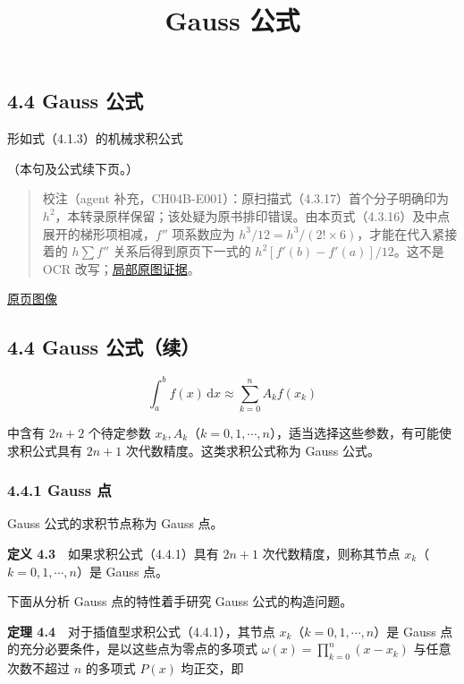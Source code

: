 \documentclass[
  10pt,
  fontset=fandol]{ctexart}
\title{Gauss 公式}
\author{}
\date{}
\begin{document}
\maketitle

\subsection{4.4 Gauss 公式}\label{gauss-ux516cux5f0f}

形如式（4.1.3）的机械求积公式

（本句及公式续下页。）

\begin{quote}
校注（agent 补充，CH04B-E001）：原扫描式（4.3.17）首个分子明确印为 \(h^2\)，本转录原样保留；该处疑为原书排印错误。由本页式（4.3.16）及中点展开的梯形项相减，\(f''\) 项系数应为 \(h^3/12=h^3/(2!\times6)\)，才能在代入紧接着的 \(h\sum f''\) 关系后得到原页下一式的 \(h^2[f'(b)-f'(a)]/12\)。这不是 OCR 改写；\href{../assets/ch04b/review-p106-middle.png}{局部原图证据}。
\end{quote}

\href{../../source-images/pdf-107.jpeg}{原页图像}

\subsection{4.4 Gauss 公式（续）}\label{gauss-ux516cux5f0fux7eed}

\[
\int_a^b f(x)\,\mathrm{d}x\approx\sum_{k=0}^{n}A_kf(x_k)
\tag{4.4.1}
\]

中含有 \(2n+2\) 个待定参数 \(x_k,A_k\)（\(k=0,1,\cdots,n\)），适当选择这些参数，有可能使求积公式具有 \(2n+1\) 次代数精度。这类求积公式称为 Gauss 公式。

\subsubsection{4.4.1 Gauss 点}\label{gauss-ux70b9}

Gauss 公式的求积节点称为 Gauss 点。

\textbf{定义 4.3}　如果求积公式（4.4.1）具有 \(2n+1\) 次代数精度，则称其节点 \(x_k\)（\(k=0,1,\cdots,n\)）是 Gauss 点。

下面从分析 Gauss 点的特性着手研究 Gauss 公式的构造问题。

\textbf{定理 4.4}　对于插值型求积公式（4.4.1），其节点 \(x_k\)（\(k=0,1,\cdots,n\)）是 Gauss 点的充分必要条件，是以这些点为零点的多项式 \(\displaystyle\omega(x)=\prod_{k=0}^{n}(x-x_k)\) 与任意次数不超过 \(n\) 的多项式 \(P(x)\) 均正交，即
\end{document}
